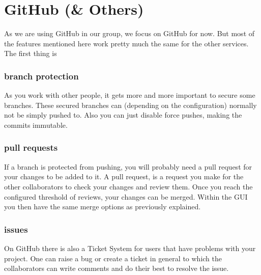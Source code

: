 \documentclass[a4paper, 12pt]{article}
\begin{document}
	\section{GitHub (\& Others)}
		
		As we are using GitHub in our group, we focus on GitHub for now. But most of the features mentioned here work pretty much the same for the other services. The first thing is 
		
		\subsubsection{branch protection}
		
			As you work with other people, it gets more and more important to secure some branches. These secured branches can (depending on the configuration) normally not be simply pushed to. Also you can just disable force pushes, making the commits immutable.
		
		\subsubsection{pull requests}
		
			If a branch is protected from pushing, you will probably need a pull request for your changes to be added to it. A pull request, is a request you make for the other collaborators to check your changes and review them. Once you reach the configured threshold of reviews, your changes can be merged. Within the GUI you then have the same merge options as previously explained.
		
		\subsubsection{issues}
		
			On GitHub there is also a Ticket System for users that have problems with your project. One can raise a bug or create a ticket in general to which the collaborators can write comments and do their best to resolve the issue.
\end{document}
